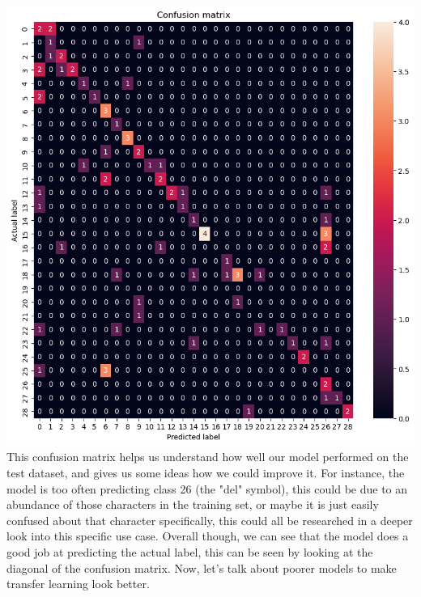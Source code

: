 \documentclass[12pt]{article}
\begin{document}
\includegraphics*[scale=0.5]{images/confusion matrix.png}\\
This confusion matrix helps us understand how well our model performed on the test dataset, and gives us some ideas how we could improve it.
For instance, the model is too often predicting class 26 (the "del" symbol), this could be due to an abundance of those characters in the training set, or maybe it is just easily confused about that character 
specifically, this could all be researched in a deeper look into this specific use case. Overall though, we can see that the model does a good job 
at predicting the actual label, this can be seen by looking at the diagonal of the confusion matrix. Now, let's talk about poorer models to make transfer learning look better.\\
\end{document}
